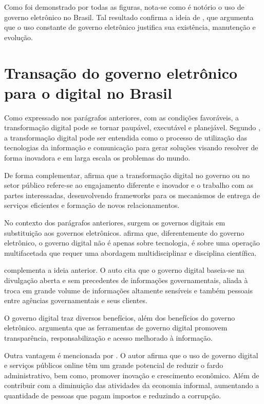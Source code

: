 Como foi demonstrado por todas as figuras, nota-se como é notório o uso de governo eletrônico no Brasil. Tal resultado confirma a ideia de \cite{singh2007country}, que argumenta que o uso constante de governo eletrônico justifica sua existência, manutenção e evolução.

\section{Transação do governo eletrônico para o digital no Brasil}

Como expressado nos parágrafos anteriores, com as condições favoráveis, a transformação digital pode se tornar paupável, executável e planejável. Segundo \cite{mitkiewicz2024transformaccao}, a transformação digital pode ser entendida como o processo de utilização das tecnologias da informação e comunicação para gerar soluções visando resolver de forma inovadora e em larga escala os problemas do mundo.

De forma complementar, \cite{alenezi2022understanding} afirma que a transformação digital no governo ou no setor público refere-se ao engajamento diferente e inovador e o trabalho com as partes interessadas, desenvolvendo frameworks para os mecanismos de entrega de serviços eficientes e formação de novos relacionamentos.

No contexto dos parágrafos anteriores, surgem os governos digitais em substituição aos governos eletrônicos. \cite{veiga2016digital} afirma que, diferentemente do governo eletrônico, o governo digital não é apenas sobre tecnologia, é sobre uma operação multifacetada  que requer uma abordagem multidisciplinar e disciplina científica. 

\cite{bounabat2017government} complementa a ideia anterior. O auto cita que o governo digital baseia-se na divulgação aberta e sem precedentes de informações governamentais, aliada à troca em grande volume de informações altamente sensíveis e também pessoais entre agências governamentais e seus clientes. 

O governo digital traz diversos benefícios, além dos benefícios do governo eletrônico. \cite{martins2018war} argumenta que as ferramentas de governo digital promovem transparência, responsabilização e acesso melhorado à informação.

Outra vantagem é mencionada por \cite{veiga2016digital}. O autor afirma que o uso de governo digital e serviços públicos online têm um grande potencial de reduzir o fardo administrativo, bem como, promover inovação e crescimento econômico. Além de contribuir com a diminuição das atividades da economia informal, aumentando a quantidade de pessoas que pagam impostos e reduzindo a corrupção.

